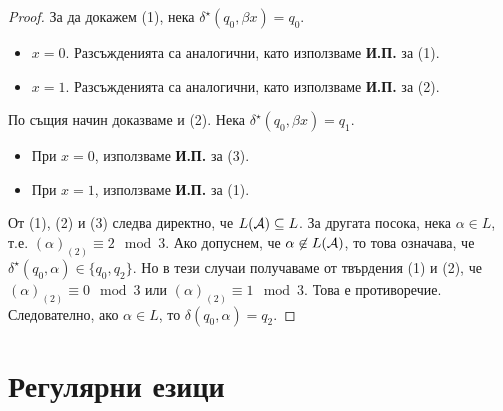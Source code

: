 \begin{proof}
  За да докажем (1), нека $\delta^\star(q_0,\beta x) = q_0$. 
  \begin{itemize}
  \item 
    $x = 0$. Разсъжденията са аналогични, като използваме {\bf И.П.} за (1).
  \item
    $x = 1$. Разсъжденията са аналогични, като използваме {\bf И.П.} за (2).
  \end{itemize}
  
  По същия начин доказваме и (2). Нека $\delta^\star(q_0,\beta x) = q_1$. 
  \begin{itemize}
  \item 
    При $x = 0$, използваме {\bf И.П.} за (3).
  \item
    При $x = 1$, използваме {\bf И.П.} за (1).
  \end{itemize}

  От (1), (2) и (3) следва директно, че $L(\mathcal{A}) \subseteq L$.
  За другата посока, нека $\alpha \in L$, т.е. $(\alpha)_{(2)} \equiv 2 \mod 3$.
  Ако допуснем, че $\alpha \not\in L(\mathcal{A})$, то това означава, че $\delta^\star(q_0,\alpha) \in \{q_0,q_2\}$.
  Но в тези случаи получаваме от твърдения (1) и (2), че $(\alpha)_{(2)} \equiv 0 \mod 3$ или $(\alpha)_{(2)} \equiv 1 \mod 3$.
  Това е противоречие. Следователно, ако $\alpha \in L$, то $\delta(q_0,\alpha) = q_2$.
\end{proof}

\section{Регулярни езици}

